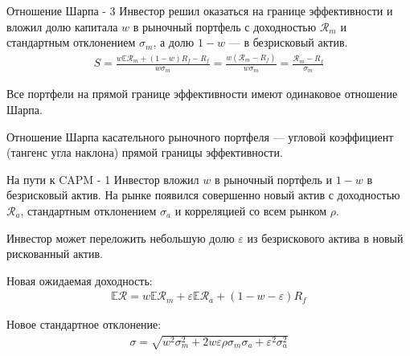 \documentclass{beamer}
\begin{document}
\begin{frame}{Отношение Шарпа - 3}
\justify
Инвестор решил оказаться на границе эффективности и вложил долю капитала $w$ в 
рыночный портфель с доходностью $\mathcal{R}_{m}$ и стандартным отклонением
$\sigma_{m}$, а долю $1-w$ --- в безрисковый актив.
\begin{align*}
S = \frac{w\mathbb{E}\mathcal{R}_{m} + (1-w)R_f - R_f}{w\sigma_{m}} = 
\frac{w(\mathcal{R}_{m} - R_f)}{w\sigma_{m}} =
\frac{\mathcal{R}_{m} - R_f}{\sigma_{m}}
\end{align*}

\justify
Все портфели на прямой границе эффективности имеют одинаковое отношение Шарпа.

\justify
Отношение Шарпа касательного рыночного портфеля --- угловой коэффициент 
(тангенс угла наклона) прямой границы эффективности.
\end{frame}



\begin{frame}{На пути к CAPM - 1}
\justify
Инвестор вложил $w$ в рыночный портфель и $1-w$ в безрисковый актив. На рынке
появился совершенно новый актив с доходностью $\mathcal{R}_{a}$, 
стандартным отклонением $\sigma_{a}$ и корреляцией со всем рынком $\rho$.

\justify
Инвестор может переложить небольшую долю $\varepsilon$ из безрискового актива в 
новый рискованный актив.

\justify
Новая ожидаемая доходность:
\begin{align*}
\mathbb{E}\mathcal{R} =
w\mathbb{E}\mathcal{R}_{m} + 
\varepsilon\mathbb{E}\mathcal{R}_a +
(1 - w - \varepsilon)R_{f}
\end{align*}

\justify
Новое стандартное отклонение:
\begin{align*}
\sigma = \sqrt{
	w^2\sigma_m^2 +
	2w\varepsilon\rho\sigma_m\sigma_a + \varepsilon^2\sigma_a^2
}
\end{align*}
\end{frame}
\end{document}
